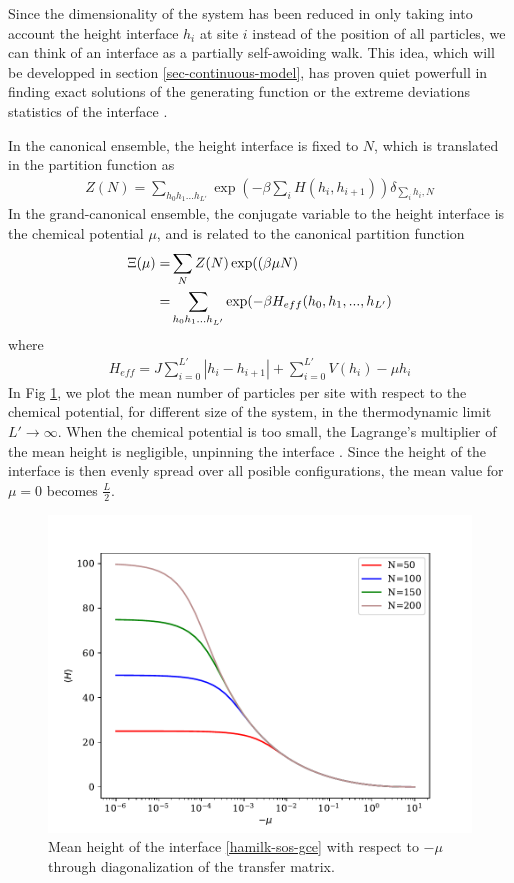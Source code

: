 {\color{red}
Since the dimensionality of the system has been reduced in only taking into account the height interface $h_i$ at site $i$ instead of the position of all particles, we can think of an interface as a partially self-awoiding walk. This idea, which will be developped in section \ref{sec-continuous-model}, has proven quiet powerfull in finding exact solutions of the generating function \cite{owczarek_exact_1993} or the extreme deviations statistics of the interface \cite{majumdar_airy_2005,schehr_universal_2006}.

In the canonical ensemble, the height interface is fixed to $N$, which is translated in the partition function as
\begin{align}
	 Z(N) = \sum_{h_0 h_1 ... h_{L'}} \exp(- \beta \sum_{i} H(h_i,h_{i+1}))  \delta_{\sum_i h_i, N}
	 \label{hamil-sos-cano}
\end{align}
In the grand-canonical ensemble, the conjugate variable to the height interface is the chemical potential $\mu$, and is related to the canonical partition function 
\begin{align}
	 \Xi(\mu) =& \sum_N Z(N) \exp((\beta \mu N) \nonumber \\
	 =&  \sum_{h_0 h_1 ... h_{L'}}  \exp(-\beta H_{eff}(h_0,h_1,...,h_{L'})
	 \label{hamilk-sos-gce}
\end{align}
where
\begin{align}
    H_{eff} = J \sum_{i=0}^{L'} |h_i-h_{i+1}|+ \sum_{i=0}^{L'} V(h_i)-\mu h_i
\end{align}
In Fig \ref{hauteur-mu}, we plot the mean number of particles per site with respect to the chemical potential, for different size of the system, in the thermodynamic limit $L' \to \infty$. When the chemical potential is too small, the Lagrange's multiplier of the mean height is negligible, unpinning the interface . Since the height of the interface is then evenly spread over all posible configurations, the mean value for $\mu=0$ becomes $\frac{L}{2}$.
}

\begin{figure}
    \centering
	\includegraphics[width=0.7\linewidth]{int-dyn/hauteur-tm-sos.pdf}
	\caption{Mean height of the interface \ref{hamilk-sos-gce} with respect to $- \mu$ through diagonalization of the transfer matrix. }
	\label{hauteur-mu}
\end{figure}

